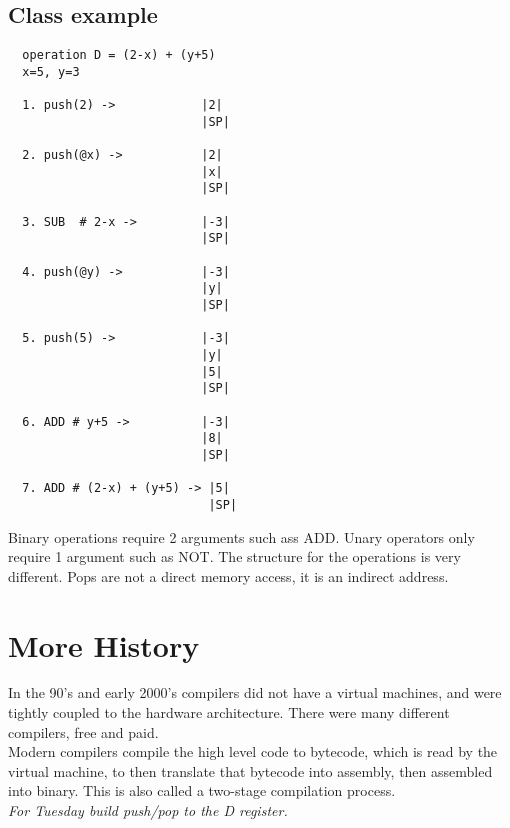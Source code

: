 \documentclass[12pt]{article}
\begin{document}
\subsection*{Class example}
\begin{verbatim}
  operation D = (2-x) + (y+5)
  x=5, y=3

  1. push(2) ->            |2|
                           |SP|

  2. push(@x) ->           |2|
                           |x|
                           |SP|

  3. SUB  # 2-x ->         |-3|
                           |SP|

  4. push(@y) ->           |-3|
                           |y|
                           |SP|

  5. push(5) ->            |-3|
                           |y|
                           |5|
                           |SP|

  6. ADD # y+5 ->          |-3|
                           |8|
                           |SP|

  7. ADD # (2-x) + (y+5) -> |5|
                            |SP|
\end{verbatim}
Binary operations require 2 arguments such ass ADD. Unary operators only
require 1 argument such as NOT. The structure for the operations is very
different. Pops are not a direct memory access, it is an indirect address.

\section*{More History}
In the 90's and early 2000's compilers did not have a virtual machines, and were tightly coupled to
the hardware architecture. There were many different compilers, free and paid.\\

Modern compilers compile the high level code to bytecode, which is read by the virtual machine, to
then translate that bytecode into assembly, then assembled into binary. This is also called a
two-stage compilation process.\\

\textit{For Tuesday build push/pop to the D register.}\\
\end{document}
